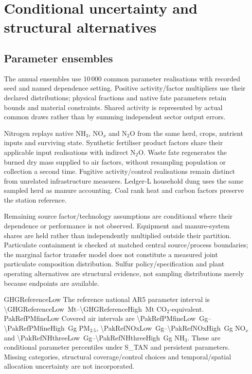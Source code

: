 \section{Conditional uncertainty and structural alternatives}\label{sec:uncertainty}
\subsection{Parameter ensembles}\label{sec:paramcoverage}\label{sec:ensemble}
The annual ensembles use 10\,000 common parameter realisations with recorded seed and named dependence setting. Positive activity/factor multipliers use their declared distributions; physical fractions and native fate parameters retain bounds and material constraints. Shared activity is represented by actual common draws rather than by summing independent sector output errors.

Nitrogen replays native NH$_3$, NO$_x$ and N$_2$O from the same herd, crops, nutrient inputs and surviving state. Synthetic fertiliser product factors share their applicable input realisations with indirect N$_2$O. Waste fate regenerates the burned dry mass supplied to air factors, without resampling population or collection a second time. Fugitive activity/control realisations remain distinct from unrelated infrastructure measures. Ledger-L household dung uses the same sampled herd as manure accounting. Coal rank heat and carbon factors preserve the station reference.

Remaining source factor/technology assumptions are conditional where their dependence or performance is not observed. Equipment and manure-system shares are held rather than independently multiplied outside their partition. Particulate containment is checked at matched central source/process boundaries; the marginal factor transfer model does not constitute a measured joint particulate composition distribution. Sulfur policy/specification and plant operating alternatives are structural evidence, not sampling distributions merely because endpoints are available.

\ifcsname GHGReferenceLow\endcsname
The reference national AR5 parameter interval is \SIrange{\GHGReferenceLow}{\GHGReferenceHigh}{\mega\tonne} CO$_2$-equivalent.\fi
\ifcsname PakRefPMfineLow\endcsname
Covered air intervals are \SIrange{\PakRefPMfineLow}{\PakRefPMfineHigh}{\giga\gram} PM$_{2.5}$, \SIrange{\PakRefNOxLow}{\PakRefNOxHigh}{\giga\gram} NO$_x$ and \SIrange{\PakRefNHthreeLow}{\PakRefNHthreeHigh}{\giga\gram} NH$_3$.\fi
These are conditional parameter percentiles under S\_TAN and persistent parameters. Missing categories, structural coverage/control choices and temporal/spatial allocation uncertainty are not incorporated.

